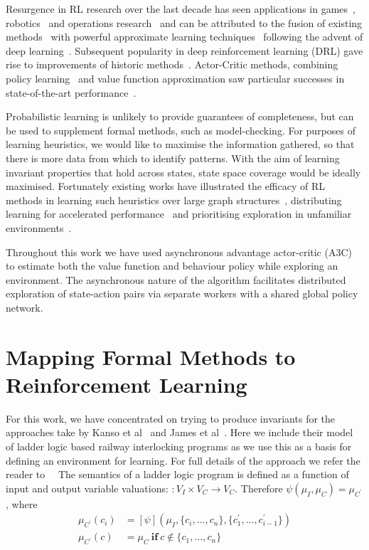 \documentclass[runningheads]{llncs}
\begin{document}
Resurgence in RL research over the last decade has seen applications in games~\cite{schaul2015prioritized, silver2016mastering, vinyals2019grandmaster}, robotics~\cite{gu2017deep, bloesch2022towards} and operations research~\cite{mazyavkina2021reinforcement} and can be attributed to the fusion of existing methods~\cite{watkins1992q} with powerful approximate learning techniques~\cite{lecun2015deep} following the advent of deep learning~\cite{mnih2013playing}. Subsequent popularity in deep reinforcement learning (DRL) gave rise to improvements of historic methods~\cite{schulman2017trust}. Actor-Critic methods, combining policy learning~\cite{kakade2001natural} and value function approximation saw particular successes in state-of-the-art performance~\cite{schulman2017proximal}.

Probabilistic learning is unlikely to provide guarantees of completeness, but can be used to supplement formal methods, such as model-checking. For purposes of learning heuristics, we would like to maximise the information gathered, so that there is more data from which to identify patterns. With the aim of learning invariant properties that hold across states, state space coverage would be ideally maximised. Fortunately existing works have illustrated the efficacy of RL methods in learning such heuristics over large graph structures~\cite{manchanda2019learning}, distributing learning for accelerated performance~\cite{hoffman2020acme} and prioritising exploration in unfamiliar environments~\cite{ostrovski2017countbased, haarnoja2018soft, gordillo2021improving}.

Throughout this work we have used asynchronous advantage actor-critic (A3C) to estimate both the value function and behaviour policy while exploring an environment. The asynchronous nature of the algorithm facilitates distributed exploration of state-action pairs via separate workers with a shared global policy network.


\section{Mapping Formal Methods to Reinforcement Learning} \label{sec:mapping_fm_to_ml}
For this work, we have concentrated on trying to produce invariants for the approaches take by Kanso et al~\cite{} and James et al~\cite{}. Here we include their model of ladder logic based railway interlocking programs as we use this as a basis for defining an environment for learning. For full details of the approach we refer the reader to~\cite{}
\
The semantics of a ladder logic program is defined as a function of input and output variable valuations:
\begin{math}
	[\psi] : V_I \times V_C \to V_C
\end{math}. Therefore $\psi(\mu_I, \mu_C) = \mu_{C^\prime}$, where
\begin{align}
	\mu_{C^\prime}(c_i) & = [\psi](\mu_I, \{c_i,...,c_n\}, \{c^\prime_1,...,c^\prime_{i-1}\}) \\
	\mu_{C^\prime}(c) & = \mu_C \ \mathbf{if} \ c \notin \{c_1,...,c_n\} 
\end{align} 
\end{document}
